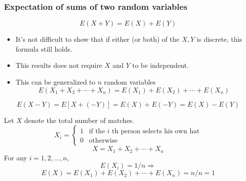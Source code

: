 \documentclass[slidestop,compress,mathserif]{beamer}
\begin{document}
\begin{frame}\frametitle{Expectation of sums of two random variables}

\[ E(X + Y) = E(X) + E(Y) \]

\pause
\begin{itemize}
\item It's not difficult to show that if either (or both) of the $X, Y$ is discrete, this formula still holds.
\item This results does not require $X$ and $Y$ to be independent. 
\item This can be generalized to $n$ random variables
\[E(X_1 + X_2 + \cdots + X_n) = E(X_1) + E(X_2) + \cdots + E(X_n)\] 
\end{itemize}

 \pause
\[E(X - Y) = E[X + (- Y)] = E(X) + E(-Y) = E(X) - E(Y) \] %
\end{frame}

\begin{frame}%



\pause
Let $X$ denote the total number of matches.
\[ X_i = \begin{cases}
            1 & \text{if the $i$ th person selects his own hat} \\
            0 & \text{otherwise}
            \end{cases}\]
\[ X = X_1 + X_2 + \cdots + X_n\]
\vspace{0.1cm}
\pause
For any $i = 1, 2, \ldots, n$,
\[ E(X_i) = 1/n \Longrightarrow\]
\[ E(X) = E(X_1) + E(X_2) + \cdots + E(X_n) = n/n = 1\]







\end{frame}
\end{document}
